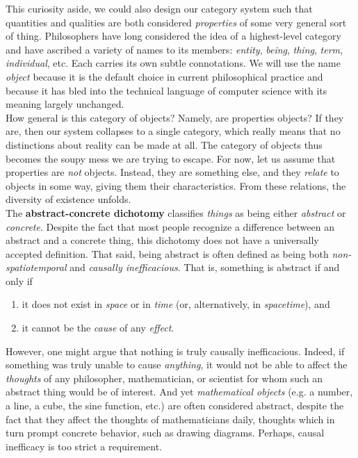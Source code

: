 This curiosity aside, we could also design our category system such that quantities and qualities are both considered \textit{properties} of some very general sort of thing. Philosophers have long considered the idea of a highest-level category and have ascribed a variety of names to its members: \textit{entity}, \textit{being}, \textit{thing}, \textit{term}, \textit{individual}, etc. Each carries its own subtle connotations. We will use the name \textit{object} because it is the default choice in current philosophical practice and because it has bled into the technical language of computer science with its meaning largely unchanged. \\

How general is this category of objects? Namely, are properties objects? If they are, then our system collapses to a single category, which really means that no distinctions about reality can be made at all. The category of objects thus becomes the soupy mess we are trying to escape. For now, let us assume that properties are \textit{not} objects. Instead, they are something else, and they \textit{relate} to objects in some way, giving them their characteristics. From these relations, the diversity of existence unfolds. \\


The \textbf{abstract-concrete dichotomy} classifies \textit{things} as being either \textit{abstract} or \textit{concrete}. Despite the fact that most people recognize a difference between an abstract and a concrete thing, this dichotomy does not have a universally accepted definition. That said, being abstract is often defined as being both \textit{non-spatiotemporal} and \textit{causally inefficacious}. That is, something is abstract if and only if 

\begin{enumerate}
	\item it does not exist in \textit{space} or in \textit{time} (or, alternatively, in \textit{spacetime}), and
	\item it cannot be the \textit{cause} of any \textit{effect}. \\
\end{enumerate}

However, one might argue that nothing is truly causally inefficacious. Indeed, if something was truly unable to cause \textit{anything}, it would not be able to affect the \textit{thoughts} of any philosopher, mathematician, or scientist for whom such an abstract thing would be of interest. And yet \textit{mathematical objects} (e.g. a number, a line, a cube, the sine function, etc.) are often considered abstract, despite the fact that they affect the thoughts of mathematicians daily, thoughts which in turn prompt concrete behavior, such as drawing diagrams. Perhaps, causal inefficacy is too strict a requirement. \\


